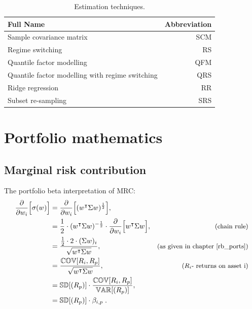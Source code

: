 \documentclass[a4paper,11pt,nocenter,bold,noupper,headcount]{mythesis}
\theoremstyle{plain}
\theoremstyle{definition}
\begin{document}
\begin{table} [h]
\caption{Estimation techniques.}
\centering
 \begin{tabular}{l r} 
 \hline
\textbf{Full Name} &  \textbf{Abbreviation}\\ 
 \hline
Sample covariance matrix & SCM \\
Regime switching & RS \\
Quantile factor modelling & QFM \\
Quantile factor modelling with regime switching & QRS \\
Ridge regression & RR \\
Subset re-sampling & SRS \\
 \hline
\end{tabular}
\end{table}

\chapter{Portfolio mathematics}

\section{Marginal risk contribution} \label{MRC_app}

The portfolio beta interpretation of MRC:
\begin{align*}
\frac{\partial}{\partial w_i} \Big [ \sigma(w) \Big ] & = \frac{\partial}{\partial w_i}  \Big [ (w^\intercal \Sigma w)^{\frac{1}{2}} \Big ], &  \\
& = \frac{1}{2} \cdot (w^\intercal \Sigma w)^{-\frac{1}{2}} \cdot \frac{\partial}{\partial w_i} \Big [ w^\intercal \Sigma w \Big ], &\footnotesize \text{(chain rule)} \\
& = \frac{\frac{1}{2}\cdot 2 \cdot (\Sigma w)_i}{\sqrt{w^\intercal \Sigma w}}, & \footnotesize \text{(as given in chapter \ref{rb_ports})} \\
& = \frac{\mathbb{COV}[R_i, R_p]}{\sqrt{w^\intercal \Sigma w}}, & \footnotesize  \text{($R_i$- returns on asset i)} \\
& = \mathbb{SD}[(R_p)] \cdot  \frac{\mathbb{COV}[R_i, R_p]}{\mathbb{VAR}[(R_p)]}, \\
& = \mathbb{SD}[(R_p)] \cdot \beta_{i, p}\;.
\end{align*}
\end{document}
